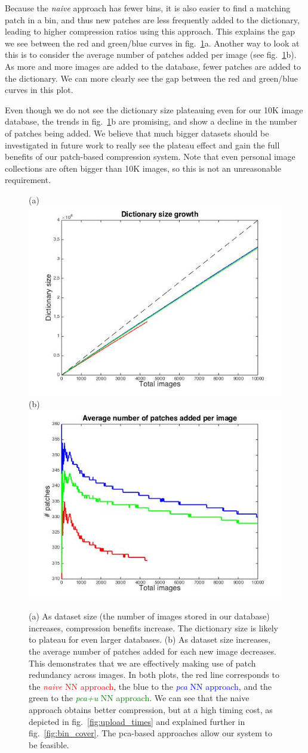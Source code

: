 Because the \emph{naive} approach has fewer bins, it is also easier to find a matching patch in a bin, and thus new patches are less frequently added to the dictionary, leading to higher compression ratios using this approach. This explains the gap we see between the red and green/blue curves in fig.~\ref{fig:dict_growth}a. Another way to look at this is to consider the average number of patches added per image (see fig.~\ref{fig:dict_growth}b). As more and more images are added to the database, fewer patches are added to the dictionary. We can more clearly see the gap between the red and green/blue curves in this plot.

Even though we do not see the dictionary size plateauing even for our 10K image database, the trends in fig.~\ref{fig:dict_growth}b are promising, and show a decline in the number of patches being added. We believe that much bigger datasets should be investigated in future work to really see the plateau effect and gain the full benefits of our patch-based compression system. Note that even personal image collections are often bigger than 10K images, so this is not an unreasonable requirement.

 \begin{figure}
\hspace{-10mm}
\centering
(a)\includegraphics[width=0.44\linewidth]{fig_NN/dict_growth.jpg}
(b)\includegraphics[width=0.44\linewidth]{fig_NN/ave_patches_per_img.jpg}
\caption{(a) As dataset size (the number of images stored in our database) increases, compression benefits increase. The dictionary size is likely to plateau for even larger databases. (b) As dataset size increases, the average number of patches added for each new image decreases. This demonstrates that we are effectively making use of patch redundancy across images. In both plots, the red line corresponds to the \textcolor{red}{\emph{naive} NN approach}, the blue to the \textcolor{blue}{\emph{pca} NN approach}, and the green to the \textcolor{green}{\emph{pca+u} NN approach}. We can see that the naive approach obtains better compression, but at a high timing cost, as depicted in fig.~\ref{fig:upload_times} and explained further in fig.~\ref{fig:bin_cover}. The pca-based approaches allow our system to be feasible.}
\label{fig:dict_growth}
\end{figure}

